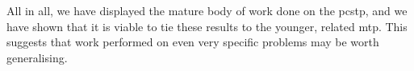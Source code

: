 All in all, we have displayed the mature body of work done
on the \acrlong{pcstp},
and we have shown that it is viable to tie these results
to the younger, related \acrlong{mtp}.
This suggests that work performed on even
very specific problems may be worth generalising.




